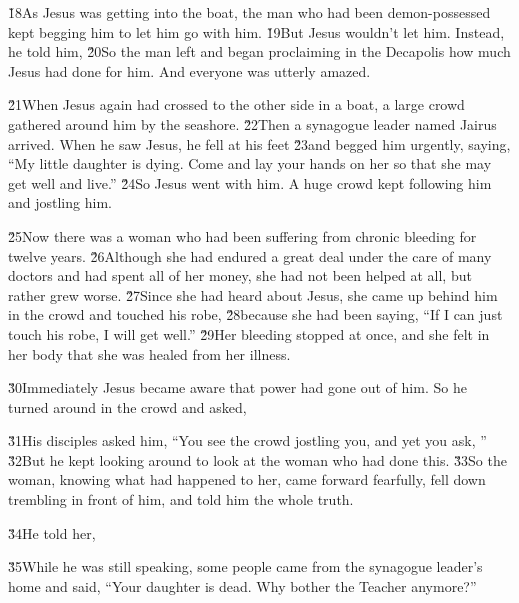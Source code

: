 \v{18}As Jesus was getting into the boat, the man who had been demon-possessed kept begging him to let him go with him. \v{19}But Jesus wouldn't let him. Instead, he told him,  \v{20}So the man left and began proclaiming in the Decapolis how much Jesus had done for him. And everyone was utterly amazed.

\v{21}When Jesus again had crossed to the other side in a boat, a large crowd gathered around him by the seashore. \v{22}Then a synagogue leader named Jairus arrived. When he saw Jesus, he fell at his feet \v{23}and begged him urgently, saying, ``My little daughter is dying. Come and lay your hands on her so that she may get well and live.'' \v{24}So Jesus went with him. A huge crowd kept following him and jostling him.

\v{25}Now there was a woman who had been suffering from chronic bleeding for twelve years. \v{26}Although she had endured a great deal under the care of many doctors and had spent all of her money, she had not been helped at all, but rather grew worse. \v{27}Since she had heard about Jesus, she came up behind him in the crowd and touched his robe, \v{28}because she had been saying, ``If I can just touch his robe, I will get well.'' \v{29}Her bleeding stopped at once, and she felt in her body that she was healed from her illness.

\v{30}Immediately Jesus became aware that power had gone out of him. So he turned around in the crowd and asked, 

\v{31}His disciples asked him, ``You see the crowd jostling you, and yet you ask, '' \v{32}But he kept looking around to look at the woman who had done this. \v{33}So the woman, knowing what had happened to her, came forward fearfully, fell down trembling in front of him, and told him the whole truth.

\v{34}He told her, 

\v{35}While he was still speaking, some people came from the synagogue leader's home and said, ``Your daughter is dead. Why bother the Teacher anymore?''

